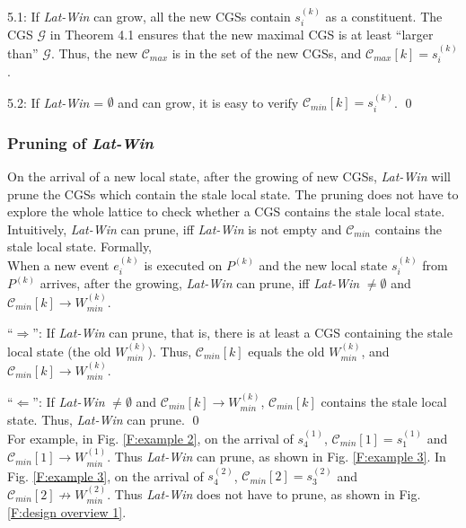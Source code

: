\documentclass[12pt,journal,letterpaper,compsoc]{IEEEtran}
\begin{document}

5.1: If {\it Lat-Win} can grow, all the new CGSs contain $s^{(k)}_i$ as a constituent. The CGS $\mathcal{G}$ in Theorem 4.1 ensures that the new maximal CGS is at least ``larger than'' $\mathcal{G}$. Thus, the new $\mathcal{C}_{max}$ is in the set of the new CGSs, and $\mathcal{C}_{max}[k] = s^{(k)}_{i}$.

5.2: If {\it Lat-Win} = $\emptyset$ and can grow, it is easy to verify $\mathcal{C}_{min}[k] = s^{(k)}_{i}$. \qed \\

\subsubsection{Pruning of {\it Lat-Win}}

On the arrival of a new local state, after the growing of new CGSs, {\it Lat-Win} will prune the CGSs which contain the stale local state. The pruning does not have to explore the whole lattice to check whether a CGS contains the stale local state. Intuitively, {\it Lat-Win} can prune, iff {\it Lat-Win} is not empty and $\mathcal{C}_{min}$ contains the stale local state. Formally, \\

 When a new event $e^{(k)}_{i}$ is executed on $P^{(k)}$ and the new local state $s^{(k)}_{i}$ from $P^{(k)}$ arrives, after the growing, {\it Lat-Win} can prune, iff {\it Lat-Win} $\neq\emptyset$ and $\mathcal{C}_{min}[k] \rightarrow W^{(k)}_{min}$.


``$\Rightarrow$'': If {\it Lat-Win} can prune, that is, there is at least a CGS containing the stale local state (the old $W^{(k)}_{min}$). Thus, $\mathcal{C}_{min}[k]$ equals the old $W^{(k)}_{min}$, and $\mathcal{C}_{min}[k] \rightarrow W^{(k)}_{min}$.

``$\Leftarrow$'': If {\it Lat-Win} $\neq \emptyset$ and $\mathcal{C}_{min}[k] \rightarrow W^{(k)}_{min}$, $\mathcal{C}_{min}[k]$ contains the stale local state. Thus, {\it Lat-Win} can prune. \qed \\

For example, in Fig. \ref{F:example 2}, on the arrival of $s^{(1)}_4$, $\mathcal{C}_{min}[1] = s^{(1)}_1$ and $\mathcal{C}_{min}[1]\rightarrow W^{(1)}_{min}$. Thus {\it Lat-Win} can prune, as shown in Fig. \ref{F:example 3}. In Fig. \ref{F:example 3}, on the arrival of $s^{(2)}_4$, $\mathcal{C}_{min}[2] = s^{(2)}_3$ and $\mathcal{C}_{min}[2]\not\rightarrow W^{(2)}_{min}$. Thus {\it Lat-Win} does not have to prune, as shown in Fig. \ref{F:design overview 1}.
\end{document}
